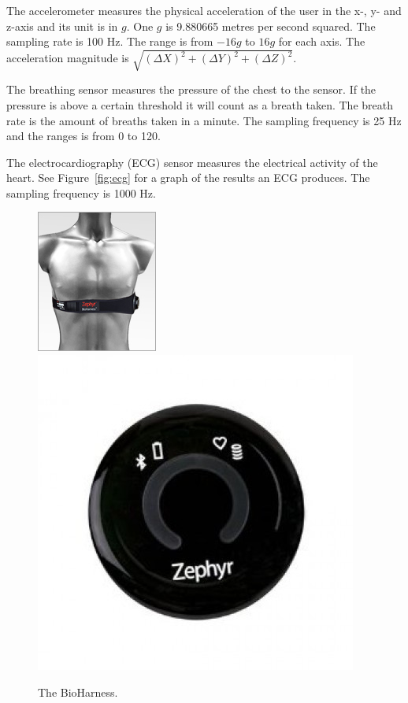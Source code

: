 			The accelerometer measures the physical acceleration of the user in the x-, y- and z-axis and its unit is in $g$. One $g$ is 9.880665 metres per second squared.  The sampling rate is 100 Hz. The range is from $-16g$ to $16g$ for each axis. The acceleration magnitude is $\sqrt{(\Delta X)^2+(\Delta Y)^2+(\Delta Z)^2}$.

			The breathing sensor measures the pressure of the chest to the sensor. If the pressure is above a certain threshold it will count as a breath taken. The breath rate is the amount of breaths taken in a minute. The sampling frequency is 25 Hz and the ranges is from 0 to 120.

			The electrocardiography (ECG) \cite{ECG} sensor measures the electrical activity of the heart. See Figure~\ref{fig:ecg} for a graph of the results an ECG produces. The sampling frequency is 1000 Hz.

			\begin{figure}[h]
				\centering
					\includegraphics[scale=2.0]{bh.jpg}
					\includegraphics[scale=0.25]{bhclose.jpg}
					
					\caption{The BioHarness.}

			\end{figure}

